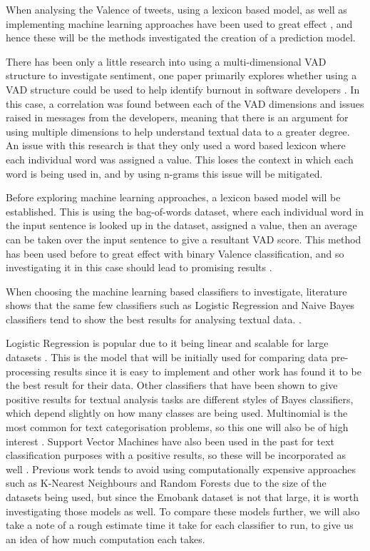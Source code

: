 When analysing the Valence of tweets, using a lexicon based model, as well as implementing machine learning approaches have been used to great effect \cite{kolchyna2015twitter}, and hence these will be the methods investigated the creation of a prediction model.

There has been only a little research into using a multi-dimensional VAD structure to investigate sentiment, one paper primarily explores whether using a VAD structure could be used to help identify burnout in software developers \cite{mantyla2016mining}. In this case, a correlation was found between each of the VAD dimensions and issues raised in messages from the developers, meaning that there is an argument for using multiple dimensions to help understand textual data to a greater degree. An issue with this research is that they only used a word based lexicon where each individual word was assigned a value. This loses the context in which each word is being used in, and by using n-grams this issue will be mitigated.

Before exploring machine learning approaches, a lexicon based model will be established. This is using the bag-of-words dataset, \cite{wordsData} where each individual word in the input sentence is looked up in the dataset, assigned a value, then an average can be taken over the input sentence to give a resultant VAD score. This method has been used before to great effect with binary Valence classification, and so investigating it in this case should lead to promising results \cite{kolchyna2015twitter}.

When choosing the machine learning based classifiers to investigate, literature shows that the same few classifiers such as Logistic Regression and Naive Bayes classifiers tend to show the best results for analysing textual data.\cite{kolchyna2015twitter} \cite{frank2006naive}.

Logistic Regression is popular due to it being linear and scalable for large datasets \cite{towardsDS}. This is the model that will be initially used for comparing data pre-processing results since it is easy to implement and other work has found it to be the best result for their data. 
Other classifiers that have been shown to give positive results for textual analysis tasks are different styles of Bayes classifiers,  which depend slightly on how many classes are being used. Multinomial is the most common for text categorisation problems, so this one will also be of high interest \cite{frank2006naive}. Support Vector Machines have also been used in the past for text classification purposes with a positive results, so these will be incorporated as well \cite{joachims1998text}. Previous work tends to avoid using computationally expensive approaches such as K-Nearest Neighbours and Random Forests due to the size of the datasets being used, but since the Emobank dataset is not that large, it is worth investigating those models as well. To compare these models further, we will also take a note of a rough estimate time it take for each classifier to run, to give us an idea of how much computation each takes.

